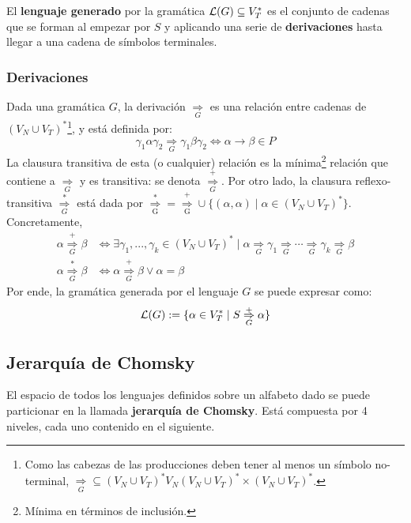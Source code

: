 El \textbf{lenguaje generado} por la gramática $\mathcal{L}(G) \subseteq V_T^*$ es el conjunto de cadenas que se forman al empezar por $S$ y aplicando una serie de \textbf{derivaciones} hasta llegar a una cadena de símbolos terminales.

\subsubsection{Derivaciones}

Dada una gramática $G$, la derivación $\underset{G}{\Rightarrow}$ es una relación entre cadenas de $(V_N \cup V_T)^*$\footnote{Como las cabezas de las producciones deben tener al menos un símbolo no-terminal, $\underset{G}{\Rightarrow} \subseteq (V_N \cup V_T)^* V_N (V_N \cup V_T)^* \times (V_N \cup V_T)^*$.}, y está definida por:
$$\gamma_1 \alpha \gamma_2 \underset{G}{\Rightarrow} \gamma_1 \beta \gamma_2 \iff \alpha \to \beta \in P$$
La clausura transitiva de esta (o cualquier) relación es la mínima\footnote{Mínima en términos de inclusión.} relación que contiene a $\underset{G}{\Rightarrow}$ y es transitiva: se denota $\overset{+}{\underset{G}{\Rightarrow}}$. Por otro lado, la clausura reflexo-transitiva $\overset{*}{\underset{G}{\Rightarrow}}$ está dada por $\mathrm{\overset{*}{\underset{G}{\Rightarrow}}} = \mathrm{\overset{+}{\underset{G}{\Rightarrow}}} \cup \{(\alpha, \alpha) \mid \alpha \in (V_N \cup V_T)^*\}$. Concretamente,
$$
\begin{aligned}
    \alpha \overset{+}{\underset{G}{\Rightarrow}} \beta & \iff \exists \gamma_1, ..., \gamma_k \in (V_N \cup V_T)^* \mid \alpha \underset{G}{\Rightarrow} \gamma_1 \underset{G}{\Rightarrow} \cdots \underset{G}{\Rightarrow} \gamma_k \underset{G}{\Rightarrow} \beta \\
    \alpha \overset{*}{\underset{G}{\Rightarrow}} \beta & \iff \alpha \overset{+}{\underset{G}{\Rightarrow}} \beta \lor \alpha = \beta
\end{aligned}
$$
Por ende, la gramática generada por el lenguaje $G$ se puede expresar como:
$$\mathcal{L}(G) := \{\alpha \in V_T^* \mid S \overset{+}{\underset{G}{\Rightarrow}} \alpha\}$$

\subsection{Jerarquía de Chomsky}

El espacio de todos los lenguajes definidos sobre un alfabeto dado se puede particionar en la llamada \textbf{jerarquía de Chomsky}. Está compuesta por 4 niveles, cada uno contenido en el siguiente.

